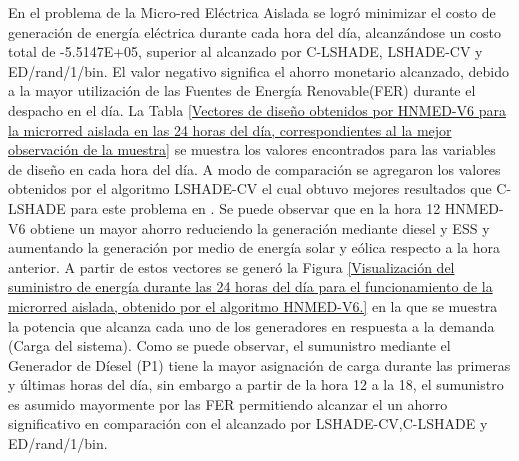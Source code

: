 En el problema de la Micro-red Eléctrica Aislada se logró minimizar el costo de generación de energía eléctrica durante cada hora del día, alcanzándose un costo total de -5.5147E+05, superior al alcanzado por C-LSHADE, LSHADE-CV y ED/rand/1/bin. El valor negativo significa el ahorro monetario alcanzado, debido a la mayor utilización de las Fuentes de Energía Renovable(FER) durante el despacho en el día.
La Tabla \ref{Vectores de diseño obtenidos por HNMED-V6 para la microrred aislada en las 24 horas del día, correspondientes al la mejor observación de la muestra} se muestra los valores encontrados para las variables de
diseño en cada hora del día. A modo de comparación se agregaron los valores obtenidos por el algoritmo LSHADE-CV el cual obtuvo mejores resultados que C-LSHADE para este problema en \cite{zapata_zapata_control_2017}. Se puede observar que en la hora 12 HNMED-V6 obtiene un mayor ahorro reduciendo la generación mediante diesel y ESS y aumentando la generación por medio de energía solar y eólica respecto a la hora anterior. A partir de estos vectores se generó la Figura \ref{Visualización del suministro de energía durante las 24 horas del día para el funcionamiento de la microrred aislada, obtenido por el algoritmo HNMED-V6.} en la que se muestra la potencia que alcanza cada uno de los generadores en respuesta a la demanda (Carga del sistema). Como se puede observar, el sumunistro mediante el Generador de Díesel (P1) tiene la mayor asignación de carga durante las primeras  y últimas horas del día, sin embargo a partir de la hora 12 a la 18, el sumunistro es asumido mayormente por las FER permitiendo alcanzar el un ahorro significativo en comparación con el alcanzado por LSHADE-CV,C-LSHADE y ED/rand/1/bin.

